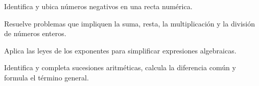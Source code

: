 \item Identifica y ubica números negativos en una recta numérica.
\item Resuelve problemas que impliquen la suma, resta, la multiplicación y la división de números enteros.
\item Aplica las leyes de los exponentes para simplificar expresiones algebraicas.
\item Identifica y completa sucesiones aritméticas, calcula la diferencia común y formula el término general.